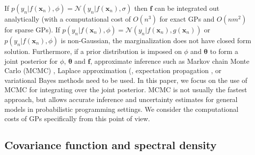 \documentclass[onecolumn,a4paper,11pt]{article}
\begin{document}

If $p(y_n|f(\bm{x}_n),\phi)=\mathcal{N}(y_n|f(\bm{x}_n),\sigma)$ then $\bm{f}$ can be integrated out analytically (with a computational cost of $O(n^3)$ for exact GPs and $O(nm^2)$ for sparse GPs). If $p(y_n|f(\bm{x}_n),\phi)=\mathcal{N}(y_n|f(\bm{x}_n),g(\bm{x}_n))$ or $p(y_n|f(\bm{x}_n),\phi)$ is non-Gaussian, the marginalization does not have closed form solution. Furthermore, if a prior distribution is imposed on $\phi$ and $\bm{\theta}$ to form a joint posterior for $\phi$, $\bm{\theta}$ and $\bm{f}$, approximate inference such as Markov chain Monte Carlo (MCMC) \citep{brooks_2011}, Laplace approximation (\citep{williams1998bayesian,rasmussen2006gaussian}, expectation propagation \citep{minka2001expectation}, or variational Bayes methods \citep{gibbs2000variational,csato2000efficient} need to be used. In this paper, we focus on the use of MCMC for integrating over the joint
posterior. MCMC is not usually the fastest approach, but allows
accurate inference and uncertainty estimates for general models in probabilistic programming
settings. We consider the computational costs of GPs specifically from
this point of view.

\subsection{Covariance function and spectral density}\label{ch4_sec_cov}
\end{document}
